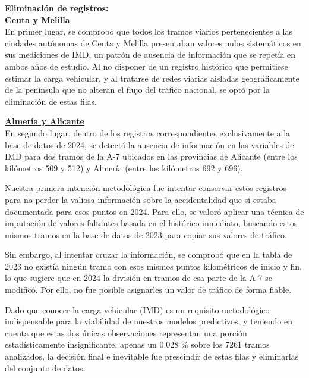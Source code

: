\documentclass[twoside,a4paper,12pt,onecolumn,openany]{book}
\begin{document}
\textbf{Eliminación de registros:} \\

\underline{\textbf{Ceuta y Melilla}}\\

En primer lugar, se comprobó que todos los tramos viarios pertenecientes a las ciudades autónomas de Ceuta y Melilla presentaban valores nulos sistemáticos en sus mediciones de IMD, un patrón de ausencia de información que se repetía en ambos años de estudio. Al no disponer de un registro histórico que permitiese estimar la carga vehicular, y al tratarse de redes viarias aisladas geográficamente de la península que no alteran el flujo del tráfico nacional, se optó por la eliminación de estas filas.

\vspace{0.5cm}

\underline{\textbf{Almería y Alicante}}\\

En segundo lugar, dentro de los registros correspondientes exclusivamente a la base de datos de 2024, se detectó la ausencia de información en las variables de IMD para dos tramos de la A-7 ubicados en las provincias de Alicante (entre los kilómetros 509 y 512) y Almería (entre los kilómetros 692 y 696).

\vspace{0.5cm}

Nuestra primera intención metodológica fue intentar conservar estos registros para no perder la valiosa información sobre la accidentalidad que sí estaba documentada para esos puntos en 2024. Para ello, se valoró aplicar una técnica de imputación de valores faltantes basada en el histórico inmediato, buscando estos mismos tramos en la base de datos de 2023 para copiar sus valores de tráfico.

\vspace{0.5cm}

Sin embargo, al intentar cruzar la información, se comprobó que en la tabla de 2023 no existía ningún tramo con esos mismos puntos kilométricos de inicio y fin, lo que sugiere que en 2024 la división en tramos de esa parte de la A-7 se modificó. Por ello, no fue posible asignarles un valor de tráfico de forma fiable.

\vspace{0.5cm}

Dado que conocer la carga vehicular (IMD) es un requisito metodológico indispensable para la viabilidad de nuestros modelos predictivos, y teniendo en cuenta que estas dos únicas observaciones representan una porción estadísticamente insignificante, apenas un 0.028 \% sobre los 7261 tramos analizados, la decisión final e inevitable fue prescindir de estas filas y eliminarlas del conjunto de datos.
\end{document}
